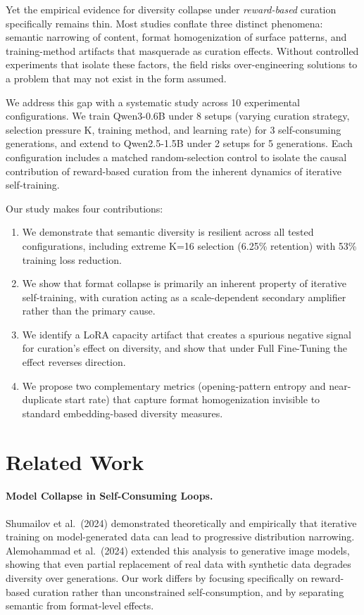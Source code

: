 \documentclass[11pt,a4paper]{article}
\begin{document}
Yet the empirical evidence for diversity collapse under \emph{reward-based} curation specifically remains thin. Most studies conflate three distinct phenomena: semantic narrowing of content, format homogenization of surface patterns, and training-method artifacts that masquerade as curation effects. Without controlled experiments that isolate these factors, the field risks over-engineering solutions to a problem that may not exist in the form assumed.

We address this gap with a systematic study across 10 experimental configurations. We train Qwen3-0.6B under 8 setups (varying curation strategy, selection pressure K, training method, and learning rate) for 3 self-consuming generations, and extend to Qwen2.5-1.5B under 2 setups for 5 generations. Each configuration includes a matched random-selection control to isolate the causal contribution of reward-based curation from the inherent dynamics of iterative self-training.

Our study makes four contributions:
\begin{enumerate}
    \item We demonstrate that semantic diversity is resilient across all tested configurations, including extreme K=16 selection (6.25\% retention) with 53\% training loss reduction.
    \item We show that format collapse is primarily an inherent property of iterative self-training, with curation acting as a scale-dependent secondary amplifier rather than the primary cause.
    \item We identify a LoRA capacity artifact that creates a spurious negative signal for curation's effect on diversity, and show that under Full Fine-Tuning the effect reverses direction.
    \item We propose two complementary metrics (opening-pattern entropy and near-duplicate start rate) that capture format homogenization invisible to standard embedding-based diversity measures.
\end{enumerate}

\section{Related Work}

\paragraph{Model Collapse in Self-Consuming Loops.}
Shumailov et al.\ (2024) demonstrated theoretically and empirically that iterative training on model-generated data can lead to progressive distribution narrowing. Alemohammad et al.\ (2024) extended this analysis to generative image models, showing that even partial replacement of real data with synthetic data degrades diversity over generations. Our work differs by focusing specifically on reward-based curation rather than unconstrained self-consumption, and by separating semantic from format-level effects.
\end{document}
